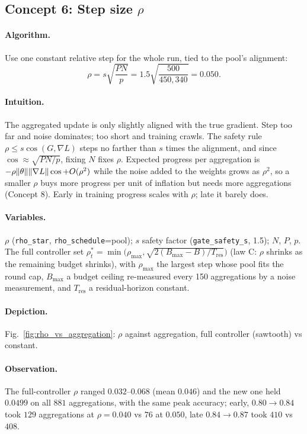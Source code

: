 \subsection{Concept 6: Step size $\rho$}
\paragraph{Algorithm.}
Use one constant relative step for the whole run, tied to the pool's alignment:
\begin{equation}
\rho=s\sqrt{\frac{PN}{p}}=1.5\sqrt{\frac{500}{450{,}340}}=0.050 .
\end{equation}
\paragraph{Intuition.}
The aggregated update is only slightly aligned with the true gradient. Step too far and noise dominates; too short and training crawls.
The safety rule $\rho\le s\cos(G,\nabla L)$ steps no farther than $s$ times the alignment, and since $\cos\approx\sqrt{PN/p}$, fixing $N$ fixes $\rho$.
Expected progress per aggregation is $-\rho\lVert \theta\rVert\lVert \nabla L\rVert\cos+O(\rho^2)$ while the noise added to the weights grows as $\rho^2$, so a smaller $\rho$ buys more progress
per unit of inflation but needs more aggregations (Concept 8). Early in training progress scales with $\rho$; late it barely does.
\paragraph{Variables.}
$\rho$ (\texttt{rho\_star}, \texttt{rho\_schedule}=pool); $s$ safety factor (\texttt{gate\_safety\_s}, 1.5); $N$, $P$, $p$.
The full controller set $\rho^*_t=\min\bigl(\rho_{\max},\sqrt{2(B_{\max}-B)/T_{\mathrm{res}}}\bigr)$ (law C: $\rho$ shrinks as the remaining budget shrinks), with $\rho_{\max}$ the largest step whose pool fits the round cap, $B_{\max}$ a budget ceiling re-measured every 150 aggregations by a noise measurement, and $T_{\mathrm{res}}$ a residual-horizon constant.
\paragraph{Depiction.} Fig.~\ref{fig:rho_vs_aggregation}: $\rho$ against aggregation, full controller (sawtooth) vs constant.
\paragraph{Observation.}
The full-controller $\rho$ ranged $0.032$--$0.068$ (mean $0.046$) and the new one held $0.0499$ on all $881$ aggregations, with the same peak accuracy; early, $0.80\to0.84$ took $129$ aggregations at $\rho{=}0.040$ vs $76$ at $0.050$, late $0.84\to0.87$ took $410$ vs $408$.

